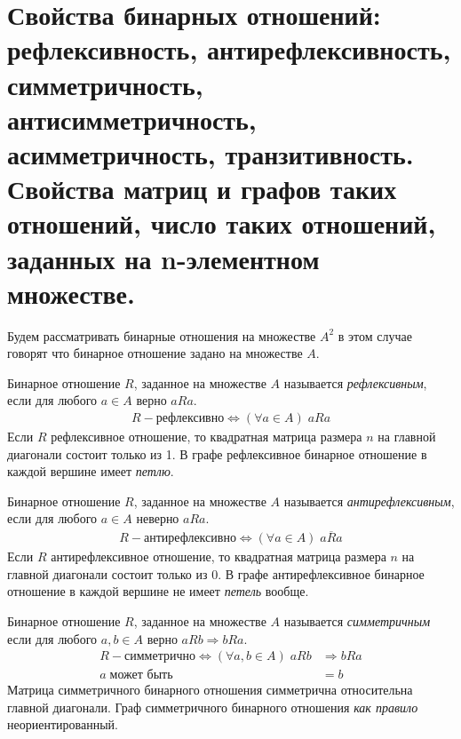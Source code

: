\section{Свойства бинарных отношений: рефлексивность, антирефлексивность, симметричность, 
антисимметричность, асимметричность, транзитивность. Свойства матриц и графов таких 
отношений, число таких отношений, заданных на n-элементном множестве.}

Будем рассматривать бинарные отношения на множестве $A^2$ в этом случае говорят что бинарное отношение задано на множестве $A$.

\begin{definition}
	Бинарное отношение $R$, заданное на множестве $A$ называется \textit{рефлексивным}, если для любого $a \in A$ верно $aRa$.
	\begin{align*}
		R - \textit{рефлексивно} \iff (\forall a \in A) \; aRa
	\end{align*}
	Если $R$ рефлексивное отношение, то квадратная матрица размера $n$ на главной диагонали состоит только из 1.
    В графе рефлексивное бинарное отношение в каждой вершине имеет \textit{петлю}.
\end{definition}

\begin{definition}
	Бинарное отношение $R$, заданное на множестве $A$ называется \textit{антирефлексивным}, если для любого $a \in A$ неверно $aRa$.
	\begin{align*}
		R - \textit{антирефлексивно} \iff (\forall a \in A) \; \overline{aRa}
	\end{align*}
    Если $R$ антирефлексивное отношение, то квадратная матрица размера $n$ на главной диагонали состоит только из 0.
    В графе антирефлексивное бинарное отношение в каждой вершине не имеет \textit{петель} вообще.
\end{definition}

\begin{definition}
	Бинарное отношение $R$, заданное на множестве $A$ называется \textit{симметричным} если для любого $a,b \in A$ верно $aRb \Rightarrow bRa$.
	\begin{align*}
		R - \textit{симметрично} \iff (\forall a, b \in A) \; aRb &\Rightarrow bRa\\
		a \; \textit{может быть} &= b
	\end{align*}
    Матрица симметричного бинарного отношения симметрична относительна главной диагонали.
    Граф симметричного бинарного отношения \textit{как правило} неориентированный.
\end{definition}

